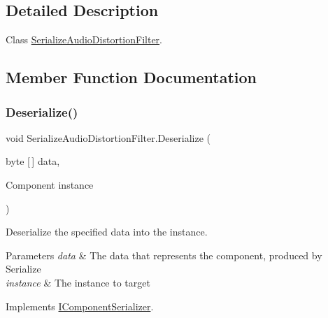 \subsection{Detailed Description}
Class \hyperlink{class_serialize_audio_distortion_filter}{Serialize\+Audio\+Distortion\+Filter}. 



\subsection{Member Function Documentation}
\mbox{\label{class_serialize_audio_distortion_filter_ac48265d0fbc0547e5d316f09828ca086}} 
\subsubsection{\texorpdfstring{Deserialize()}{Deserialize()}}
{\footnotesize\ttfamily void Serialize\+Audio\+Distortion\+Filter.\+Deserialize (\begin{DoxyParamCaption}\item[{byte \mbox{[}$\,$\mbox{]}}]{data,  }\item[{Component}]{instance }\end{DoxyParamCaption})\hspace{0.3cm}{\ttfamily [inline]}}



Deserialize the specified data into the instance. 


\begin{DoxyParams}{Parameters}
{\em data} & The data that represents the component, produced by Serialize\\
\hline
{\em instance} & The instance to target\\
\hline
\end{DoxyParams}


Implements \hyperlink{interface_i_component_serializer_a4cc366a5c78b33d47a90c209d8fed883}{I\+Component\+Serializer}.

\mbox{\label{class_serialize_audio_distortion_filter_a035cc0e02b72b00fdc39d0fbfe5c2b96}} 
